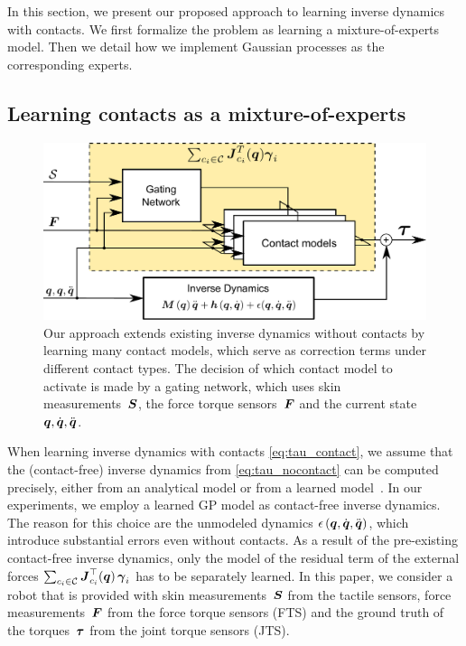 In this section, we present our proposed approach to learning inverse dynamics with contacts.
We first formalize the problem as learning a mixture-of-experts model.
Then we detail how we implement Gaussian processes as the corresponding experts.


\subsection{Learning contacts as a mixture-of-experts}
		
	\begin{figure}[t]
		\centering
		\includegraphics[width =.7\linewidth]{robertoICRA/fig/diagram_2.pdf}
		\caption{Our approach extends existing inverse dynamics without contacts by learning many contact models, which serve as correction terms under different contact types. The decision of which contact model to activate is made by a gating network, which uses skin measurements~$\mathcal{\boldsymbol{S}}$, the force torque sensors~$\boldsymbol{F}$ and the current state $\boldsymbol q, \dot{\boldsymbol q}, \ddot{\boldsymbol q}$.}
		\label{fig:model}
        \figspace
	\end{figure}
	When learning inverse dynamics with contacts \eq\eqref{eq:tau_contact}, we assume that the (contact-free) inverse dynamics from \eq\eqref{eq:tau_nocontact} can be computed precisely, either from an analytical model or from a learned model~\cite{Nguyen-Tuong2011}.
    In our experiments, we employ a learned GP model as contact-free inverse dynamics.
    The reason for this choice are the unmodeled dynamics $\epsilon\,(\boldsymbol q,\dot{\boldsymbol q},\ddot{\boldsymbol q})$, which introduce substantial errors even without contacts.
	As a result of the pre-existing contact-free inverse dynamics, only the model of the residual term of the external forces $\sum_{c_i \in\mathcal{C}} {\boldsymbol J^\top_{c_i}(\boldsymbol q)}\, \boldsymbol{\gamma}_i$ has to be separately learned.
    In this paper, we consider a robot that is provided with skin measurements~$\mathcal{\boldsymbol{S}}$ from the tactile sensors, force measurements~$\boldsymbol{F}$ from the force torque sensors (FTS) and the ground truth of the torques~$\boldsymbol{\tau}$ from the joint torque sensors (JTS).

